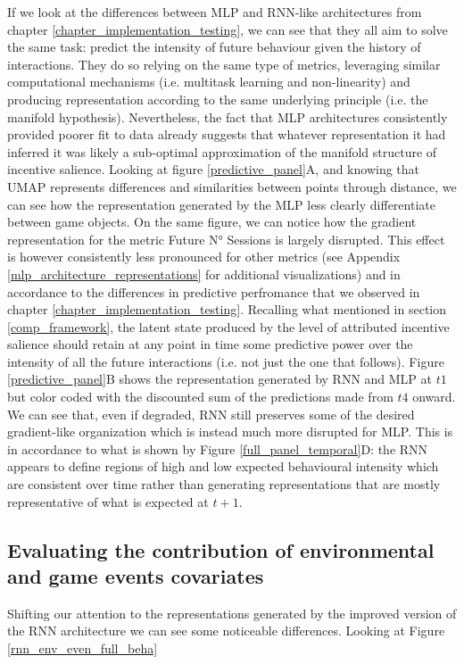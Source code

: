 If we look at the differences between MLP and RNN-like architectures from chapter \ref{chapter_implementation_testing}, we can see that they all aim to solve the same task: predict the intensity of future behaviour given the history of interactions. They do so relying on the same type of metrics, leveraging similar computational mechanisms (i.e. multitask learning and non-linearity) and producing representation according to the same underlying principle (i.e. the manifold hypothesis). Nevertheless, the fact that MLP architectures consistently provided poorer fit to data already suggests that whatever representation it had inferred it was likely a sub-optimal approximation of the manifold structure of incentive salience. Looking at figure \ref{predictive_panel}A, and knowing that UMAP represents differences and similarities between points through distance, we can see how the representation generated by the MLP less clearly differentiate between game objects. On the same figure, we can notice how the gradient representation for the metric Future N° Sessions is largely disrupted. This effect is however consistently less pronounced for other metrics (see Appendix \ref{mlp_architecture_representations} for additional visualizations) and in accordance to the differences in predictive perfromance that we observed in chapter \ref{chapter_implementation_testing}. Recalling what mentioned in section \ref{comp_framework}, the latent state produced by the level of attributed incentive salience should retain at any point in time some predictive power over the intensity of all the future interactions (i.e. not just the one that follows). Figure \ref{predictive_panel}B shows the representation generated by RNN and MLP at $t1$ but color coded with the discounted sum of the predictions made from $t4$ onward. We can see that, even if degraded, RNN still preserves some of the desired gradient-like organization which is instead much more disrupted for MLP. This is in accordance to what is shown by Figure \ref{full_panel_temporal}D: the RNN appears to define regions of high and low expected behavioural intensity which are consistent over time rather than generating representations that are mostly representative of what is expected at $t+1$.

\subsection{Evaluating the contribution of environmental and game events covariates}
\label{representation_env_even}
Shifting our attention to the representations generated by the improved version of the RNN architecture we can see some noticeable differences. Looking at Figure \ref{rnn_env_even_full_beha} 


